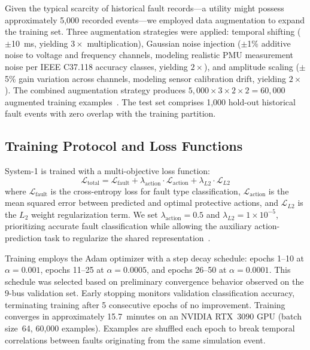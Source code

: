 \documentclass[journal]{IEEEtran}
\begin{document}
Given the typical scarcity of historical fault records---a utility might possess approximately 5,000 recorded events---we employed data augmentation to expand the training set. Three augmentation strategies were applied: temporal shifting ($\pm$10~ms, yielding $3\times$ multiplication), Gaussian noise injection ($\pm$1\% additive noise to voltage and frequency channels, modeling realistic PMU measurement noise per IEEE C37.118 accuracy classes, yielding $2\times$), and amplitude scaling ($\pm$5\% gain variation across channels, modeling sensor calibration drift, yielding $2\times$). The combined augmentation strategy produces $5,000 \times 3 \times 2 \times 2 = 60,000$ augmented training examples~\cite{ref27}. The test set comprises 1,000 hold-out historical fault events with zero overlap with the training partition.

\subsection{Training Protocol and Loss Functions}

System-1 is trained with a multi-objective loss function:
\begin{equation}
\mathcal{L}_{\text{total}} = \mathcal{L}_{\text{fault}} + \lambda_{\text{action}} \cdot \mathcal{L}_{\text{action}} + \lambda_{L2} \cdot \mathcal{L}_{L2}
\end{equation}
where $\mathcal{L}_{\text{fault}}$ is the cross-entropy loss for fault type classification, $\mathcal{L}_{\text{action}}$ is the mean squared error between predicted and optimal protective actions, and $\mathcal{L}_{L2}$ is the $L_2$ weight regularization term. We set $\lambda_{\text{action}} = 0.5$ and $\lambda_{L2} = 1\!\times\!10^{-5}$, prioritizing accurate fault classification while allowing the auxiliary action-prediction task to regularize the shared representation~\cite{ref28}.

Training employs the Adam optimizer with a step decay schedule: epochs 1--10 at $\alpha = 0.001$, epochs 11--25 at $\alpha = 0.0005$, and epochs 26--50 at $\alpha = 0.0001$. This schedule was selected based on preliminary convergence behavior observed on the 9-bus validation set. Early stopping monitors validation classification accuracy, terminating training after 5 consecutive epochs of no improvement. Training converges in approximately 15.7~minutes on an NVIDIA RTX~3090 GPU (batch size~64, 60,000 examples). Examples are shuffled each epoch to break temporal correlations between faults originating from the same simulation event.
\end{document}
